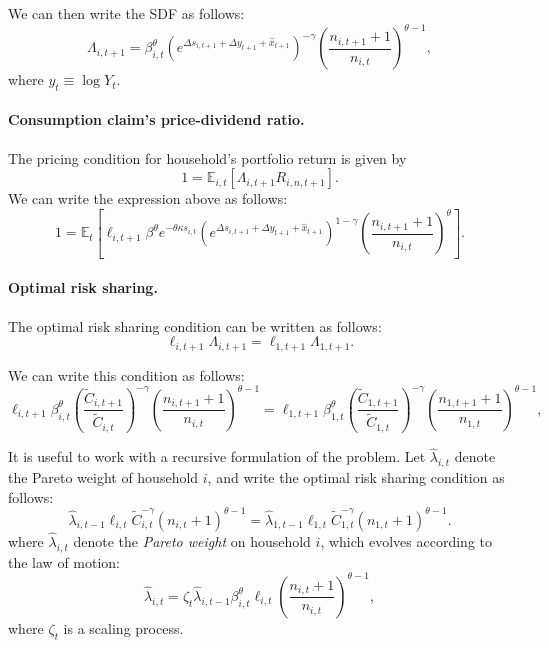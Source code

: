 We can then write the SDF as follows:
\begin{equation}
    \Lambda_{i,t+1} = \beta_{i,t}^\theta \left( e^{\Delta s_{i,t+1} + \Delta y_{t+1} + \hat{x}_{t+1}} \right)^{-\gamma} \left( \frac{n_{i,t+1}+1}{n_{i,t}} \right)^{\theta-1},
\end{equation}
where $y_{t} \equiv \log Y_t$. 

\paragraph{Consumption claim's price-dividend ratio.} The pricing condition for household's portfolio return is given by
\begin{equation}
    1 = \mathbb{E}_{i,t}\left[ \Lambda_{i,t+1} R_{i,n,t+1} \right]. 
\end{equation}
We can write the expression above as follows:
\begin{equation}
    1 = \mathbb{E}_{t}\left[ \ell_{i,t+1} \beta^\theta e^{-\theta \kappa s_{i,t}} \left( e^{\Delta s_{i,t+1} + \Delta y_{t+1} + \hat{x}_{t+1}} \right)^{1-\gamma} \left( \frac{n_{i,t+1}+1}{n_{i,t}} \right)^{\theta} \right].
\end{equation}

\paragraph{Optimal risk sharing.} The optimal risk sharing condition can be written as follows:
\begin{equation}
    \ell_{i,t+1} \Lambda_{i,t+1} = \ell_{1,t+1} \Lambda_{1,t+1}.
\end{equation}

We can write this condition as follows:
\begin{equation}
    \ell_{i,t+1}\beta_{i,t}^\theta \left( \frac{\tilde{C}_{i,t+1}}{\tilde{C}_{i,t}} \right)^{-\gamma} \left( \frac{n_{i,t+1} + 1}{n_{i,t}} \right)^{\theta-1}=
    \ell_{1,t+1}\beta_{1,t}^\theta \left( \frac{\tilde{C}_{1,t+1}}{\tilde{C}_{1,t}} \right)^{-\gamma} \left( \frac{n_{1,t+1} + 1}{n_{1,t}} \right)^{\theta-1},
\end{equation}

It is useful to work with a recursive formulation of the problem. 
Let $\hat{\lambda}_{i,t}$ denote the Pareto weight of household $i$, and write the optimal risk sharing condition as follows:
\begin{equation}\label{eq:optimal_rs}
    \hat{\lambda}_{i,t-1} \ell_{i,t} \tilde{C}_{i,t}^{-\gamma} (n_{i,t}+1)^{\theta-1} = \hat{\lambda}_{1,t-1} \ell_{1,t} \tilde{C}_{1,t}^{-\gamma} (n_{1,t}+1)^{\theta-1}.
\end{equation}
where $\hat{\lambda}_{i,t}$ denote the \textit{Pareto weight} on household $i$, which evolves according to the law of motion:
\begin{equation}\label{eq:optimal_rs2}
    \hat{\lambda}_{i,t} = \zeta_t \hat{\lambda}_{i,t-1} \beta_{i,t}^\theta \ell_{i,t} \left( \frac{n_{i,t}+1}{n_{i,t}} \right)^{\theta-1},
\end{equation}
where $\zeta_t$ is a scaling process. 

